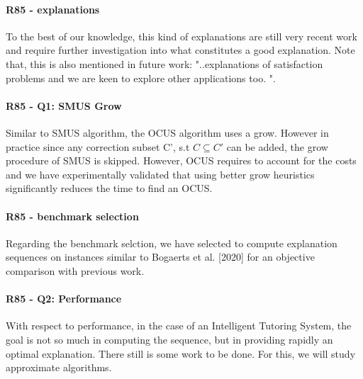 \documentclass{article}
\newcommand\comment[1]{\marginpar{\tiny #1}}
\renewcommand\comment[1]{#1}
\newcommand{\todo}[1]{{\comment{{\color{blue} #1}}}}
\begin{document}
\paragraph{R85 - explanations} To the best of our knowledge, this kind of explanations are still very recent work and require further investigation into what constitutes a good explanation. Note that, this is also mentioned in future work: "..explanations of satisfaction problems and we are keen to explore other applications too. ".

\paragraph{R85 - Q1: SMUS Grow} Similar to SMUS algorithm, the OCUS algorithm uses a grow. However in practice since any correction subset C', s.t $C \subseteq C'$ can be added, the grow procedure of SMUS is skipped. However, OCUS requires to account for the costs and we have experimentally validated that using better grow heuristics significantly reduces the time to find an OCUS.

\paragraph{R85 - benchmark selection}  Regarding the benchmark selction, we have selected to compute explanation sequences on instances similar to Bogaerts et al. [2020] for an objective comparison with previous work. 
 
\paragraph{R85 - Q2: Performance} With respect to performance, in the case of an Intelligent Tutoring System, the goal is not so much in computing the sequence, but in providing rapidly an optimal explanation. There still is some work to be done. For this, we will study approximate algorithms.



%
%
%
%
%
%
%	
%
%	
\end{document}

